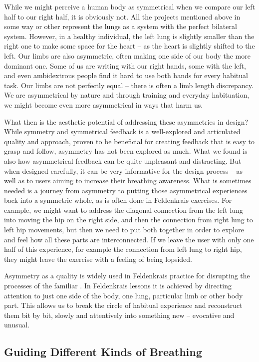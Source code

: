 While we might perceive a human body as symmetrical when we compare our left half to our right half, it is obviously not. All the projects mentioned above in some way or other represent the lungs as a system with the perfect bilateral system. However, in a healthy individual, the left lung is slightly smaller than the right one to make some space for the heart -- as the heart is slightly shifted to the left. Our limbs are also asymmetric, often making one side of our body the more dominant one. Some of us are writing with our right hands, some with the left, and even ambidextrous people find it hard to use both hands for every habitual task. Our limbs are not perfectly equal -- there is often a limb length discrepancy. We are asymmetrical by nature and through training and everyday habituation, we might become even more asymmetrical in ways that harm us.

What then is the aesthetic potential of addressing these asymmetries in design? While symmetry and symmetrical feedback is a well-explored and articulated quality and approach, proven to be beneficial for creating feedback that is easy to grasp and follow, asymmetry has not been explored as much. What we found is also how asymmetrical feedback can be quite unpleasant and distracting. But when designed carefully, it can be very informative for the design process -- as well as to users aiming to increase their breathing awareness. What is sometimes needed is a journey from asymmetry to putting those asymmetrical experiences back into a symmetric whole, as is often done in Feldenkrais exercises. For example, we might want to address the diagonal connection from the left lung into moving the hip on the right side, and then the connection from right lung to left hip movements, but then we need to put both together in order to explore and feel how all these parts are interconnected. If we leave the user with only one half of this experience, for example the connection from left lung to right hip, they might leave the exercise with a feeling of being lopsided. 

Asymmetry as a quality is widely used in Feldenkrais practice for disrupting the processes of the familiar \cite{worth_symmetry_2015}. In Feldenkrais lessons it is achieved by directing attention to just one side of the body, one lung, particular limb or other body part. This allows us to break the circle of habitual experience and reconstruct them bit by bit, slowly and attentively into something new -- evocative and unusual. 

\subsection{Guiding Different Kinds of Breathing}

